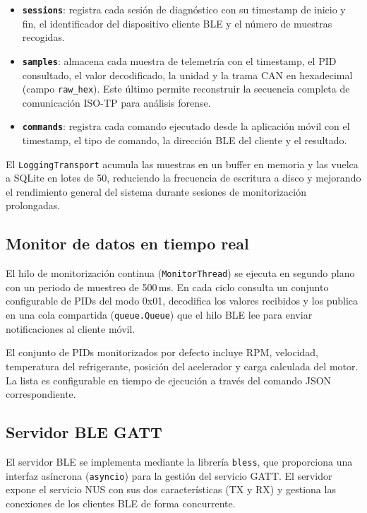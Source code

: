 \begin{itemize}
    \item \textbf{\texttt{sessions}}: registra cada sesión de diagnóstico con su timestamp de inicio y fin, el identificador del dispositivo cliente BLE y el número de muestras recogidas.

    \item \textbf{\texttt{samples}}: almacena cada muestra de telemetría con el timestamp, el PID consultado, el valor decodificado, la unidad y la trama CAN en hexadecimal (campo \texttt{raw\_hex}). Este último permite reconstruir la secuencia completa de comunicación ISO-TP para análisis forense.

    \item \textbf{\texttt{commands}}: registra cada comando ejecutado desde la aplicación móvil con el timestamp, el tipo de comando, la dirección BLE del cliente y el resultado.
\end{itemize}

El \texttt{LoggingTransport} acumula las muestras en un buffer en memoria y las vuelca a SQLite en lotes de 50, reduciendo la frecuencia de escritura a disco y mejorando el rendimiento general del sistema durante sesiones de monitorización prolongadas.


\subsection{Monitor de datos en tiempo real}

El hilo de monitorización continua (\texttt{MonitorThread}) se ejecuta en segundo plano con un periodo de muestreo de 500\,ms. En cada ciclo consulta un conjunto configurable de PIDs del modo 0x01, decodifica los valores recibidos y los publica en una cola compartida (\texttt{queue.Queue}) que el hilo BLE lee para enviar notificaciones al cliente móvil.

El conjunto de PIDs monitorizados por defecto incluye RPM, velocidad, temperatura del refrigerante, posición del acelerador y carga calculada del motor. La lista es configurable en tiempo de ejecución a través del comando JSON correspondiente.


\subsection{Servidor BLE GATT}

El servidor BLE se implementa mediante la librería \texttt{bless}, que proporciona una interfaz asíncrona (\texttt{asyncio}) para la gestión del servicio GATT. El servidor expone el servicio NUS con sus dos características (TX y RX) y gestiona las conexiones de los clientes BLE de forma concurrente.


